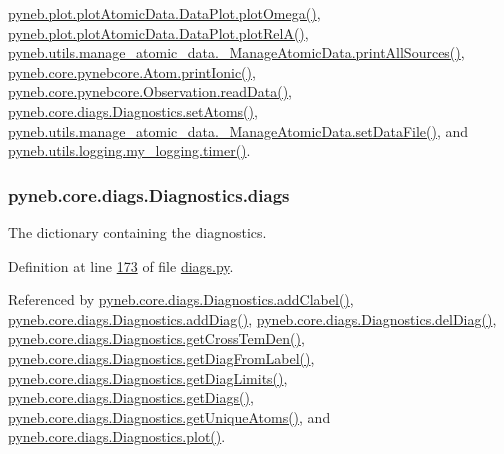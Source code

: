 \hyperlink{plot_atomic_data_8py_source_l00372}{pyneb.\+plot.\+plot\+Atomic\+Data.\+Data\+Plot.\+plot\+Omega()}, \hyperlink{plot_atomic_data_8py_source_l00261}{pyneb.\+plot.\+plot\+Atomic\+Data.\+Data\+Plot.\+plot\+Rel\+A()}, \hyperlink{manage__atomic__data_8py_source_l00431}{pyneb.\+utils.\+manage\+\_\+atomic\+\_\+data.\+\_\+\+Manage\+Atomic\+Data.\+print\+All\+Sources()}, \hyperlink{pynebcore_8py_source_l02167}{pyneb.\+core.\+pynebcore.\+Atom.\+print\+Ionic()}, \hyperlink{pynebcore_8py_source_l03589}{pyneb.\+core.\+pynebcore.\+Observation.\+read\+Data()}, \hyperlink{diags_8py_source_l00393}{pyneb.\+core.\+diags.\+Diagnostics.\+set\+Atoms()}, \hyperlink{manage__atomic__data_8py_source_l00380}{pyneb.\+utils.\+manage\+\_\+atomic\+\_\+data.\+\_\+\+Manage\+Atomic\+Data.\+set\+Data\+File()}, and \hyperlink{logging_8py_source_l00115}{pyneb.\+utils.\+logging.\+my\+\_\+logging.\+timer()}.

\hypertarget{classpyneb_1_1core_1_1diags_1_1_diagnostics_a0c0f7e36097677f61a6a14a0c3127b02}{}
\subsubsection[{diags}]{\setlength{\rightskip}{0pt plus 5cm}pyneb.\+core.\+diags.\+Diagnostics.\+diags}\label{classpyneb_1_1core_1_1diags_1_1_diagnostics_a0c0f7e36097677f61a6a14a0c3127b02}


The dictionary containing the diagnostics. 



Definition at line \hyperlink{diags_8py_source_l00173}{173} of file \hyperlink{diags_8py_source}{diags.\+py}.



Referenced by \hyperlink{diags_8py_source_l00410}{pyneb.\+core.\+diags.\+Diagnostics.\+add\+Clabel()}, \hyperlink{diags_8py_source_l00246}{pyneb.\+core.\+diags.\+Diagnostics.\+add\+Diag()}, \hyperlink{diags_8py_source_l00336}{pyneb.\+core.\+diags.\+Diagnostics.\+del\+Diag()}, \hyperlink{diags_8py_source_l00554}{pyneb.\+core.\+diags.\+Diagnostics.\+get\+Cross\+Tem\+Den()}, \hyperlink{diags_8py_source_l00183}{pyneb.\+core.\+diags.\+Diagnostics.\+get\+Diag\+From\+Label()}, \hyperlink{diags_8py_source_l00706}{pyneb.\+core.\+diags.\+Diagnostics.\+get\+Diag\+Limits()}, \hyperlink{diags_8py_source_l00201}{pyneb.\+core.\+diags.\+Diagnostics.\+get\+Diags()}, \hyperlink{diags_8py_source_l00237}{pyneb.\+core.\+diags.\+Diagnostics.\+get\+Unique\+Atoms()}, and \hyperlink{diags_8py_source_l00421}{pyneb.\+core.\+diags.\+Diagnostics.\+plot()}.


